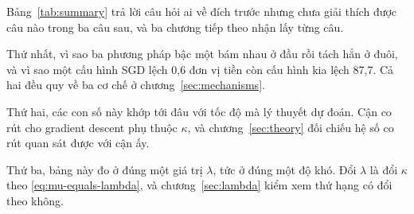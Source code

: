 Bảng~\ref{tab:summary} trả lời câu hỏi ai về đích trước nhưng chưa giải thích
được câu nào trong ba câu sau, và ba chương tiếp theo nhận lấy từng câu.

Thứ nhất, vì sao ba phương pháp bậc một bám nhau ở đầu rồi tách hẳn ở đuôi, và vì
sao một cấu hình SGD lệch 0,6 đơn vị tiền còn cấu hình kia lệch 87,7. Cả hai đều
quy về ba cơ chế ở chương~\ref{sec:mechanisms}.

Thứ hai, các con số này khớp tới đâu với tốc độ mà lý thuyết dự đoán. Cận co rút
cho gradient descent phụ thuộc $\kappa$, và chương~\ref{sec:theory} đối chiếu hệ
số co rút quan sát được với cận ấy.

Thứ ba, bảng này đo ở đúng một giá trị $\lambda$, tức ở đúng một độ khó. Đổi
$\lambda$ là đổi $\kappa$ theo \eqref{eq:mu-equals-lambda}, và
chương~\ref{sec:lambda} kiểm xem thứ hạng có đổi theo không.

